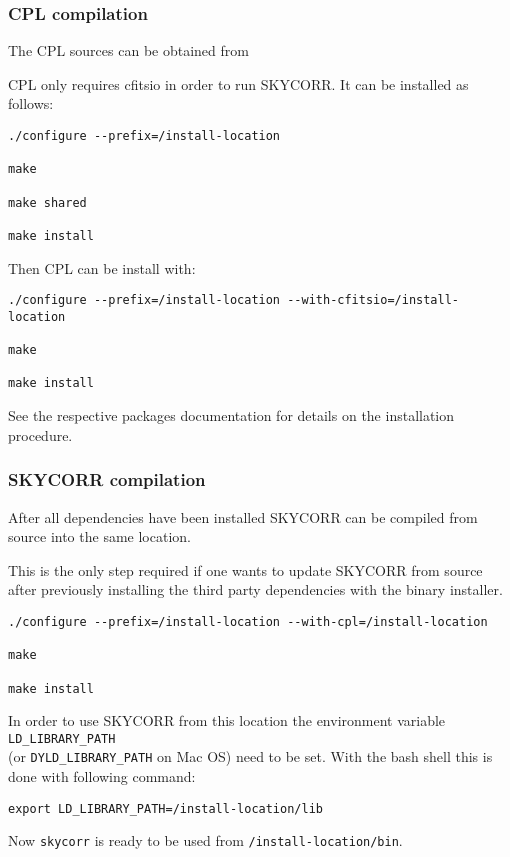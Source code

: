 \subsubsection{CPL compilation}

The CPL sources can be obtained from \cite{CPL}

CPL only requires cfitsio in order to run SKYCORR. It can be installed as
follows:

\begin{verbatim}
./configure --prefix=/install-location

make

make shared

make install
\end{verbatim}

Then CPL can be install with:

\begin{verbatim}
./configure --prefix=/install-location --with-cfitsio=/install-location

make

make install
\end{verbatim}

See the respective packages documentation for details on the
installation procedure.

\subsubsection{SKYCORR compilation}

After all dependencies have been installed SKYCORR can be compiled from source
into the same location.

This is the only step required if one wants to update SKYCORR from
source after previously installing the third party dependencies with the
binary installer.

\begin{verbatim}
./configure --prefix=/install-location --with-cpl=/install-location

make

make install
\end{verbatim}

In order to use SKYCORR from this location the environment variable
{\tt LD\_LIBRARY\_PATH} \\(or {\tt DYLD\_LIBRARY\_PATH} on Mac OS) need to be
set. With the bash shell this is done with following command:

\begin{verbatim}
export LD_LIBRARY_PATH=/install-location/lib
\end{verbatim}

Now {\tt skycorr} is ready to be used from {\tt /install-location/bin}.
